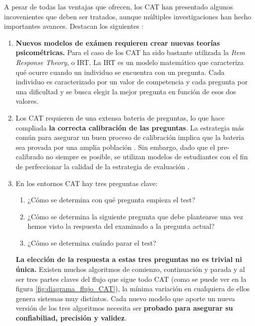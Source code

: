 A pesar de todas las ventajas que ofrecen, los \acrshort{CAT} han presentado algunos incovenientes que deben ser tratados, aunque múltiples investigaciones han hecho importantes avances. Destacan los siguientes \cite{Wainer00}:

\begin{enumerate}
 	\item \textbf{Nuevos modelos de exámen requieren crear nuevas teorías psicométricas.} Para el caso de los \acrshort{CAT} ha sido bastante utilizada la \textit{Item Response Theory}, o \acrshort{IRT}. La \acrshort{IRT} es un modelo matemático que caracteriza qué ocurre cuando un individuo se encuentra con un pregunta. Cada individuo es caracterizado por un valor de competencia y cada pregunta por una dificultad y se busca elegir la mejor pregunta en función de esos dos valores\cite{Wainer83}.
	\item Los \acrshort{CAT} requieren de una extensa bateria de preguntas, lo que hace compliada \textbf{la correcta calibración de las preguntas}. La estrategia más común para asegurar un buen proceso de calibración implica que la bateria sea provada por una amplia población \cite{Klinkenberg11}. Sin embargo, dado que el pre-calibrado no siempre es posible, se utilizan modelos de estudiantes con el fin de perfeccionar la calidad de la estrategia de evaluación \cite{Antal11}\cite{Galvez09}\cite{Molins14Test}.
	\item En los entornos \acrshort{CAT} hay tres preguntas clave:
	\begin{enumerate}
		\item ¿Cómo se determina con qué pregunta empieza el test?
		\item ¿Cómo se determina la siguiente pregunta que debe plantearse una vez hemos visto la respuesta del examinado a la pregunta actual?
		\item ¿Cómo se determina cuándo parar el test?
	\end{enumerate}
	\textbf{La elección de la respuesta a estas tres preguntas no es trivial ni única.} Existen muchos algoritmos de comienzo, continuación y parada y al ser tres partes claves del flujo que sigue todo \acrshort{CAT} (como se puede ver en la figura \ref{fig:diagrama_flujo_CAT}), la mínima variación en cualquiera de ellos genera sistemas muy distintos. Cada nuevo modelo que aporte un nueva versión de los tres algoritmos necesita ser \textbf{probado para asegurar su confiabiliad, precisión y validez}\cite{Wainer00}.
\end{enumerate}

